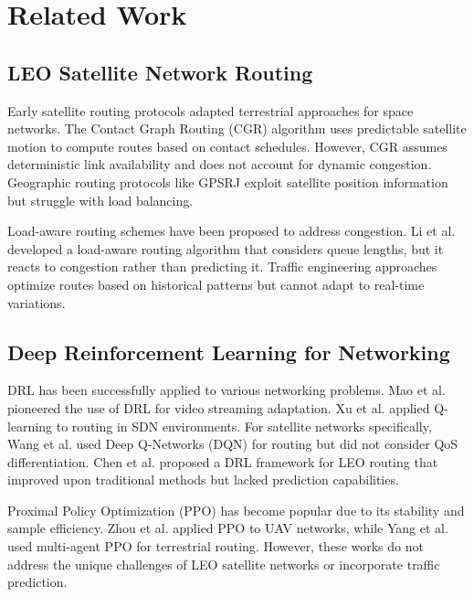 \documentclass[journal]{IEEEtran}
\begin{document}
\section{Related Work}

\subsection{LEO Satellite Network Routing}

Early satellite routing protocols adapted terrestrial approaches for space networks. The Contact Graph Routing (CGR) algorithm \cite{burleigh2016contact} uses predictable satellite motion to compute routes based on contact schedules. However, CGR assumes deterministic link availability and does not account for dynamic congestion. Geographic routing protocols like GPSRJ \cite{cheng2016novel} exploit satellite position information but struggle with load balancing.

Load-aware routing schemes have been proposed to address congestion. Li et al. \cite{li2018load} developed a load-aware routing algorithm that considers queue lengths, but it reacts to congestion rather than predicting it. Traffic engineering approaches \cite{wang2020traffic} optimize routes based on historical patterns but cannot adapt to real-time variations.

\subsection{Deep Reinforcement Learning for Networking}

DRL has been successfully applied to various networking problems. Mao et al. \cite{mao2016resource} pioneered the use of DRL for video streaming adaptation. Xu et al. \cite{xu2018experience} applied Q-learning to routing in SDN environments. For satellite networks specifically, Wang et al. \cite{wang2021intelligent} used Deep Q-Networks (DQN) for routing but did not consider QoS differentiation. Chen et al. \cite{chen2021deep} proposed a DRL framework for LEO routing that improved upon traditional methods but lacked prediction capabilities.

Proximal Policy Optimization (PPO) \cite{schulman2017proximal} has become popular due to its stability and sample efficiency. Zhou et al. \cite{zhou2021intelligent} applied PPO to UAV networks, while Yang et al. \cite{yang2021multi} used multi-agent PPO for terrestrial routing. However, these works do not address the unique challenges of LEO satellite networks or incorporate traffic prediction.
\end{document}
